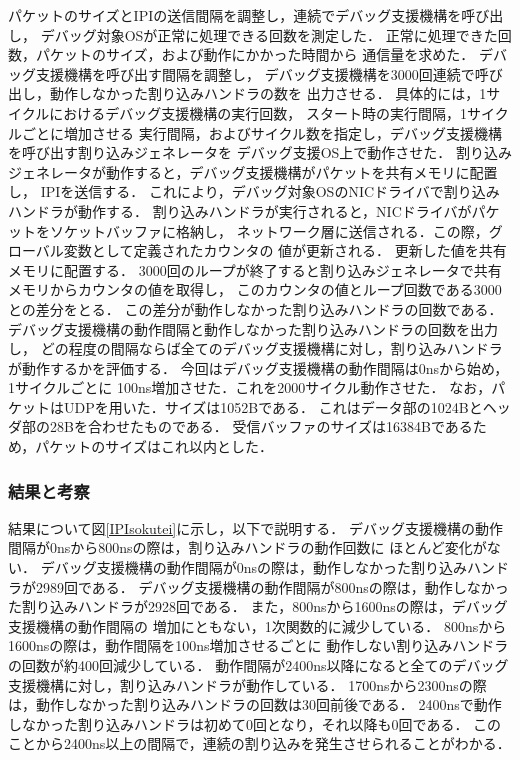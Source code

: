 \documentclass[submit,techreq,noauthor,dvipdfmx]{ipsj}
\begin{document}
パケットのサイズとIPIの送信間隔を調整し，連続でデバッグ支援機構を呼び出し，
デバッグ対象OSが正常に処理できる回数を測定した．
正常に処理できた回数，パケットのサイズ，および動作にかかった時間から
通信量を求めた．
デバッグ支援機構を呼び出す間隔を調整し，
デバッグ支援機構を3000回連続で呼び出し，動作しなかった割り込みハンドラの数を
出力させる．
具体的には，1サイクルにおけるデバッグ支援機構の実行回数，
スタート時の実行間隔，1サイクルごとに増加させる
実行間隔，およびサイクル数を指定し，デバッグ支援機構を呼び出す割り込みジェネレータを
デバッグ支援OS上で動作させた．
割り込みジェネレータが動作すると，デバッグ支援機構がパケットを共有メモリに配置し，
IPIを送信する．
これにより，デバッグ対象OSのNICドライバで割り込みハンドラが動作する．
割り込みハンドラが実行されると，NICドライバがパケットをソケットバッファに格納し，
ネットワーク層に送信される．この際，グローバル変数として定義されたカウンタの
値が更新される．
更新した値を共有メモリに配置する．
3000回のループが終了すると割り込みジェネレータで共有メモリからカウンタの値を取得し，
このカウンタの値とループ回数である3000との差分をとる．
この差分が動作しなかった割り込みハンドラの回数である．
デバッグ支援機構の動作間隔と動作しなかった割り込みハンドラの回数を出力し，
どの程度の間隔ならば全てのデバッグ支援機構に対し，割り込みハンドラが動作するかを評価する．
今回はデバッグ支援機構の動作間隔は0nsから始め，1サイクルごとに
100ns増加させた．これを2000サイクル動作させた．
なお，パケットはUDPを用いた．サイズは1052Bである．
これはデータ部の1024Bとヘッダ部の28Bを合わせたものである．
受信バッファのサイズは16384Bであるため，パケットのサイズはこれ以内とした．

\subsubsection{結果と考察}\label{sec:method_of_evaluation}


結果について図\ref{IPIsokutei}に示し，以下で説明する．
デバッグ支援機構の動作間隔が0nsから800nsの際は，割り込みハンドラの動作回数に
ほとんど変化がない．
デバッグ支援機構の動作間隔が0nsの際は，動作しなかった割り込みハンドラが2989回である．
デバッグ支援機構の動作間隔が800nsの際は，動作しなかった割り込みハンドラが2928回である．
また，800nsから1600nsの際は，デバッグ支援機構の動作間隔の
増加にともない，1次関数的に減少している．
800nsから1600nsの際は，動作間隔を100ns増加させるごとに
動作しない割り込みハンドラの回数が約400回減少している．
動作間隔が2400ns以降になると全てのデバッグ支援機構に対し，割り込みハンドラが動作している．
1700nsから2300nsの際は，動作しなかった割り込みハンドラの回数は30回前後である．
2400nsで動作しなかった割り込みハンドラは初めて0回となり，それ以降も0回である．
このことから2400ns以上の間隔で，連続の割り込みを発生させられることがわかる．
\end{document}
